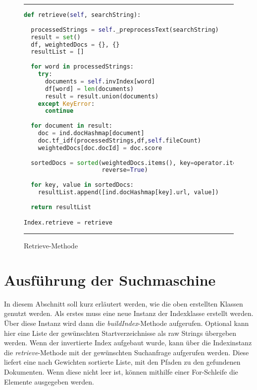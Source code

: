 \begin{figure}
	\rule{\textwidth}{0.4pt}
		\begin{lstlisting}[language=Python]
def retrieve(self, searchString):
 
  processedStrings = self._preprocessText(searchString)
  result = set()
  df, weightedDocs = {}, {}
  resultList = []
    
  for word in processedStrings:
    try:
      documents = self.invIndex[word]
      df[word] = len(documents)
      result = result.union(documents)
    except KeyError:
      continue
    
  for document in result:
    doc = ind.docHashmap[document]
    doc.tf_idf(processedStrings,df,self.fileCount)
    weightedDocs[doc.docId] = doc.score
        
  sortedDocs = sorted(weightedDocs.items(), key=operator.itemgetter(1),
                      reverse=True)
    
  for key, value in sortedDocs:
    resultList.append([ind.docHashmap[key].url, value])
        
  return resultList

Index.retrieve = retrieve
		\end{lstlisting}
	\rule{\textwidth}{0.4pt}
	\caption{Retrieve-Methode}
	\label{fig:retrieve}
\end{figure}

\section{Ausführung der Suchmaschine}

In diesem Abschnitt soll kurz erläutert werden, wie die oben erstellten Klassen genutzt werden. Als erstes muss eine neue Instanz der Indexklasse erstellt werden. Über diese Instanz wird dann die \textit{buildIndex}-Methode aufgerufen. Optional kann hier eine Liste der gewünschten Startverzeichnisse als raw Strings übergeben werden. Wenn der invertierte Index aufgebaut wurde, kann über die Indexinstanz die \textit{retrieve}-Methode mit der gewünschten Suchanfrage aufgerufen werden. Diese liefert eine nach Gewichten sortierte Liste, mit den Pfaden zu den gefundenen Dokumenten. Wenn diese nicht leer ist, können mithilfe einer For-Schleife die Elemente ausgegeben werden.

